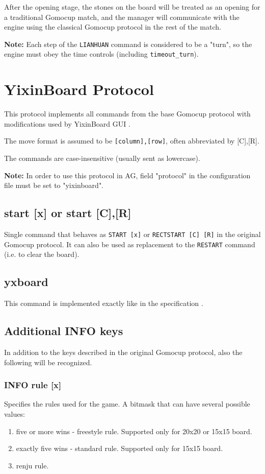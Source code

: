 \documentclass[12pt,a4paper]{article}
\begin{document}
After the opening stage, the stones on the board will be treated as an opening for a traditional Gomocup match, and the manager will communicate with the engine using the classical Gomocup protocol in the rest of the match.

\textbf{Note:} Each step of the \texttt{LIANHUAN} command is considered to be a "turn", so the engine must obey the time controls (including \texttt{timeout{\_}turn}).



\newpage
\section{YixinBoard Protocol}
This protocol implements all commands from the base Gomocup protocol with modifications used by YixinBoard GUI \cite{yixinboard}.

The move format is assumed to be \texttt{[column],[row]}, often abbreviated by [C],[R].

The commands are case-insensitive (usually sent as lowercase).

\textbf{Note:} In order to use this protocol in AG, field "protocol" in the configuration file must be set to "yixinboard".

\subsection{start [x] or start [C],[R]}
\label{cmd_yxstart}
Single command that behaves as \texttt{START [x]} or \texttt{RECTSTART [C] [R]} in the original Gomocup protocol. It can also be used as replacement to the \texttt{RESTART} command (i.e. to clear the board).


\subsection{yxboard}
\label{cmd_yxboard}
This command is implemented exactly like in the specification \cite{yixinboard}.


\subsection{Additional INFO keys}
\label{cmd_ysinfo_extension1}
In addition to the keys described in the original Gomocup protocol, also the following will be recognized.

\subsubsection{INFO rule [x]}
\label{cmd_yxinfo_rule}
Specifies the rules used for the game. A bitmask that can have several possible values:
\begin{enumerate}[leftmargin=7.5em]
	\item[\text{$[x]=0$}]{five or more wins - freestyle rule. Supported only for 20x20 or 15x15 board.}
	\item[\text{$[x]=1$}]{exactly five wins - standard rule. Supported only for 15x15 board.}
	\item[\text{$[x]=2$}]{renju rule.}
\end{enumerate}
\end{document}
